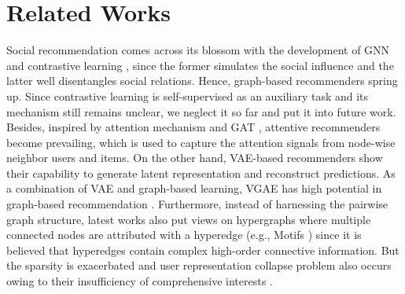 \documentclass[letterpaper]{article} %
\begin{document}
\section{Related Works}
Social recommendation comes across its blossom with the development of GNN \cite{GCN, MPNN, graphsage} and contrastive learning \cite{sgl}, since the former simulates the social influence and the latter well disentangles social relations. Hence, graph-based recommenders \cite{ngcf,lightgcn} spring up. Since contrastive learning is self-supervised as an auxiliary task and its mechanism still remains unclear\cite{augmentation}, we neglect it so far and put it into future work. Besides, inspired by attention mechanism \cite{attention} and GAT \cite{GAT}, attentive recommenders \cite{diffnet++} become prevailing, which is used to capture the attention signals from node-wise neighbor users and items. On the other hand, VAE-based recommenders \cite{multivae,jova} show their capability to generate latent representation and reconstruct predictions. As a combination of VAE and graph-based learning, VGAE \cite{VGAE} has high potential in graph-based recommendation \cite{vgae_rec}. Furthermore, instead of harnessing the pairwise graph structure, latest works \cite{MHCN, ESRF} also put views on hypergraphs where multiple connected nodes are attributed with a hyperedge (e.g., Motifs \cite{motif}) since it is believed that hyperedges contain complex high-order connective information. But the sparsity is exacerbated and user representation collapse problem also occurs owing to their insufficiency of comprehensive interests \cite{collapse}.
\end{document}

